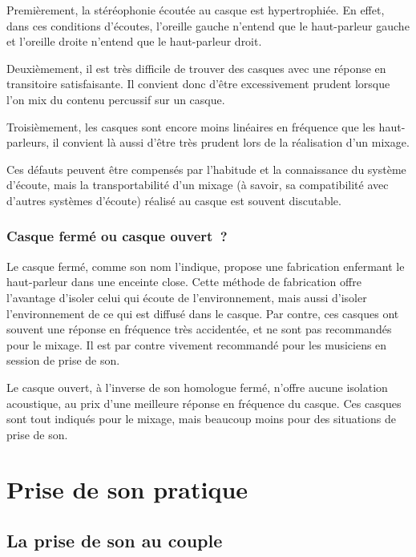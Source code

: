 \documentclass[
]{book}
\begin{document}
Premièrement, la stéréophonie écoutée au casque est hypertrophiée. En effet, dans ces conditions d'écoutes, l'oreille gauche n'entend que le haut-parleur gauche et l'oreille droite n'entend que le haut-parleur droit.

Deuxièmement, il est très difficile de trouver des casques avec une réponse en transitoire satisfaisante. Il convient donc d'être excessivement prudent lorsque l'on mix du contenu percussif sur un casque.

Troisièmement, les casques sont encore moins linéaires en fréquence que les haut-parleurs, il convient là aussi d'être très prudent lors de la réalisation d'un mixage.

Ces défauts peuvent être compensés par l'habitude et la connaissance du système d'écoute, mais la transportabilité d'un mixage (à savoir, sa compatibilité avec d'autres systèmes d'écoute) réalisé au casque est souvent discutable.

\hypertarget{casque-fermuxe9-ou-casque-ouvert}{%
\section{Casque fermé ou casque ouvert~?}\label{casque-fermuxe9-ou-casque-ouvert}}

Le casque fermé, comme son nom l'indique, propose une fabrication enfermant le haut-parleur dans une enceinte close. Cette méthode de fabrication offre l'avantage d'isoler celui qui écoute de l'environnement, mais aussi d'isoler l'environnement de ce qui est diffusé dans le casque. Par contre, ces casques ont souvent une réponse en fréquence très accidentée, et ne sont pas recommandés pour le mixage. Il est par contre vivement recommandé pour les musiciens en session de prise de son.

Le casque ouvert, à l'inverse de son homologue fermé, n'offre aucune isolation acoustique, au prix d'une meilleure réponse en fréquence du casque. Ces casques sont tout indiqués pour le mixage, mais beaucoup moins pour des situations de prise de son.

\hypertarget{part-prise-de-son-pratique}{%
\part{Prise de son pratique}\label{part-prise-de-son-pratique}}

\hypertarget{la-prise-de-son-au-couple}{%
\chapter{La prise de son au couple}\label{la-prise-de-son-au-couple}}
\end{document}

